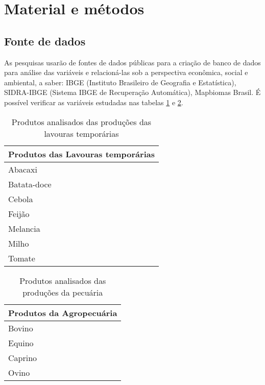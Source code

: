 

\section{Material e métodos}


\subsection{Fonte de dados}

As pesquisas usarão de fontes de dados públicas para a criação de banco de dados para análise das variáveis e relacioná-las sob a perspectiva
econômica, social e ambiental, a saber: IBGE (Instituto Brasileiro de Geografia e Estatística), SIDRA-IBGE (Sistema IBGE de Recuperação Automática), Mapbiomas Brasil. É possível verificar as variáveis estudadas nas tabelas \ref{tab:produto_analisados-lavtemp} e \ref{tab:produto_analisados-pecuaria}.

\begin{center}
    \begin{table}[!htb]
        \centering
        \begin{tabular}{|p{}|}
        \hline
        \textbf{Produtos das Lavouras temporárias} \\ \hline
           Abacaxi \\ 
            \hline
           Batata-doce \\ 
            \hline
           Cebola \\ 
            \hline
           Feijão \\
            \hline
           Melancia \\
            \hline
           Milho \\
            \hline
           Tomate \\
            \hline  
            \end{tabular}
        \caption{Produtos analisados das produções das lavouras temporárias}
        \label{tab:produto_analisados-lavtemp}
    \end{table}
\end{center}


\begin{center}
    \begin{table}[!htb]
        \centering
        \begin{tabular}{|p{}|}
        \hline
        \textbf{Produtos da Agropecuária} \\ 
            \hline  
            Bovino \\
            \hline  
            Equino \\
            \hline  
            Caprino \\
            \hline  
            Ovino \\
            \hline  
            \end{tabular}
        \caption{Produtos analisados das produções da pecuária}
        \label{tab:produto_analisados-pecuaria}
    \end{table}
\end{center}


